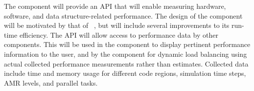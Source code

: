 \documentclass[11pt,letterpaper]{article}
\begin{document}
% 

%
The  component will provide an API that will enable
measuring hardware, software, and data structure-related performance.
The design of the  component will be motivated by
that of ~\cite{wwwlcaperf}, but will include several
improvements to its run-time efficiency.
The API will allow access to performance data by other components.
This will be used in the  component to display pertinent
performance information to the user, and by the 
component for dynamic load balancing using actual collected
performance measurements rather than estimates.  Collected data include
time and memory usage for different code regions, simulation time steps,
AMR levels, and parallel tasks.
\end{document}
